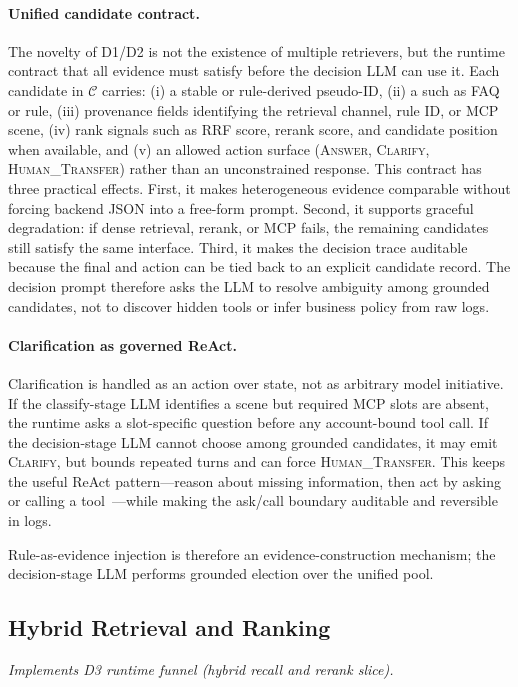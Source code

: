 \documentclass[sigconf,review]{acmart}
\newcommand{\code}[1]{\texttt{\seqsplit{#1}}}
\begin{document}
\paragraph{Unified candidate contract.}
The novelty of D1/D2 is not the existence of multiple retrievers, but the runtime contract that all evidence must satisfy before the decision LLM can use it.
Each candidate in $\mathcal{C}$ carries: (i) a stable \code{issue\_id} or rule-derived pseudo-ID, (ii) a \code{category} such as FAQ or rule, (iii) provenance fields identifying the retrieval channel, rule ID, or MCP scene, (iv) rank signals such as RRF score, rerank score, and candidate position when available, and (v) an allowed action surface (\textsc{Answer}, \textsc{Clarify}, \textsc{Human\_Transfer}) rather than an unconstrained response.
This contract has three practical effects.
First, it makes heterogeneous evidence comparable without forcing backend JSON into a free-form prompt.
Second, it supports graceful degradation: if dense retrieval, rerank, or MCP fails, the remaining candidates still satisfy the same interface.
Third, it makes the decision trace auditable because the final \code{issue\_id} and action can be tied back to an explicit candidate record.
The decision prompt therefore asks the LLM to resolve ambiguity among grounded candidates, not to discover hidden tools or infer business policy from raw logs.

\paragraph{Clarification as governed ReAct.}
Clarification is handled as an action over state, not as arbitrary model initiative. If the classify-stage LLM identifies a scene but required MCP slots are absent, the runtime asks a slot-specific question before any account-bound tool call. If the decision-stage LLM cannot choose among grounded candidates, it may emit \textsc{Clarify}, but \code{clarify\_count} bounds repeated turns and can force \textsc{Human\_Transfer}. This keeps the useful ReAct pattern---reason about missing information, then act by asking or calling a tool~\cite{yao2023react}---while making the ask/call boundary auditable and reversible in logs.

Rule-as-evidence injection is therefore an evidence-construction mechanism; the decision-stage LLM performs grounded election over the unified pool.

\subsection{Hybrid Retrieval and Ranking}
\label{sec:hybrid}
\noindent\textit{Implements D3 runtime funnel (hybrid recall and rerank slice).}
\end{document}
